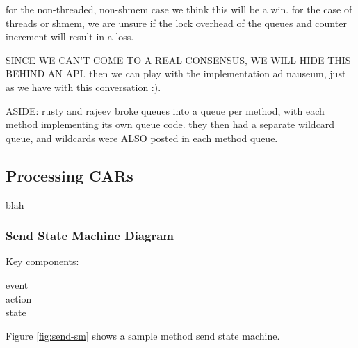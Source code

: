 \documentclass[11pt,letterpaper]{article}
\begin{document}
  for the non-threaded, non-shmem case we think this will be a win.  for the
  case of threads or shmem, we are unsure if the lock overhead of the queues
  and counter increment will result in a loss.

  SINCE WE CAN'T COME TO A REAL CONSENSUS, WE WILL HIDE THIS BEHIND AN API.
  then we can play with the implementation ad nauseum, just as we have with
  this conversation :).

ASIDE:
  rusty and rajeev broke queues into a queue per method, with each method
  implementing its own queue code.  they then had a separate wildcard queue,
  and wildcards were ALSO posted in each method queue.

%
%


%
%
\subsection{Processing CARs}

blah

%
%
\subsubsection{Send State Machine Diagram}

Key components:
\begin{description}
\item[event]
\item[action]
\item[state]
\end{description}

Figure \ref{fig:send-sm} shows a sample method send state machine.
\end{document}
